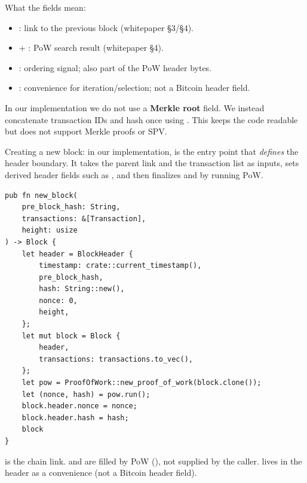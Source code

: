 What the fields mean:
\begin{itemize}
  \item {}: link to the previous block (whitepaper \S3/\S4).
  \item {} + : PoW search result (whitepaper \S4).
  \item {}: ordering signal; also part of the PoW header bytes.
  \item {}: convenience for iteration/selection; not a Bitcoin header field.
\end{itemize}

\begin{notebox}
In our implementation we do not use a \textbf{Merkle root} field. We
instead concatenate transaction IDs and hash once using
. This keeps the code readable but
does not support Merkle proofs or SPV.
\end{notebox}

Creating a new block: in our implementation,
 is the
entry point that \emph{defines} the header boundary. It takes the parent
link and the transaction list as inputs, sets derived header fields such
as , and then finalizes  and  by
running PoW.

\begin{listing}[htbp]
\caption{ --- creating and mining a block}
\label{lst:9-1-2}
\begin{verbatim}
pub fn new_block(
    pre_block_hash: String,
    transactions: &[Transaction],
    height: usize
) -> Block {
    let header = BlockHeader {
        timestamp: crate::current_timestamp(),
        pre_block_hash,
        hash: String::new(),
        nonce: 0,
        height,
    };
    let mut block = Block {
        header,
        transactions: transactions.to_vec(),
    };
    let pow = ProofOfWork::new_proof_of_work(block.clone());
    let (nonce, hash) = pow.run();
    block.header.nonce = nonce;
    block.header.hash = hash;
    block
}
\end{verbatim}
\end{listing}

\begin{checkpointbox}
 is the chain link.  and 
are filled by PoW (), not supplied by the
caller.  lives in the header as a convenience (not a
Bitcoin header field).
\end{checkpointbox}

